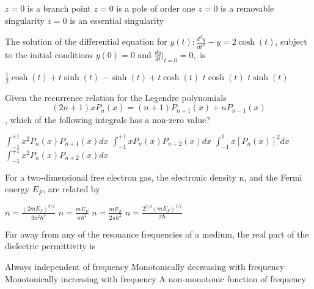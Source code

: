 \documentclass{exam}
\begin{document}
\begin{questions}
\begin{choices}
	\choice $z=0$ is a branch point \choice $z=0$ is a pole of order one
	\choice $z=0$ is a removable singularity \choice $z=0$ is an essential singularity
\end{choices}

\question The solution of the differential equation for $y(t): \frac{d^{2}y}{dt^{2}}-y=2\cosh(t)$, subject to the initial conditions $y(0)=0$ and $\frac{dy}{dt}|_{t=0}=0,$ is\hfill{}

\begin{choices}
	\begin{multicols}{2}
	 \choice $\frac{1}{2}\cosh(t)+t\sinh(t)$ \choice $-\sinh(t)+t\cosh(t)$
	\choice $t\cosh(t)$ \choice $t\sinh(t)$
	\end{multicols}
\end{choices}

\question Given the recurrence relation for the Legendre polynomials $$(2n+1) x P_n(x)=(n+1) P_{n+1}(x)+nP_{n-1}(x)$$, which of the following integrals has a non-zero value?\hfill{}

\begin{choices}
	\begin{multicols}{2}
	 \choice $\int_{-1}^{+1}x^{2}P_{n}(x)P_{n+1}(x)dx$ \choice $\int_{-1}^{+1}x P_{n}(x)P_{n+2}(x)dx$
	\choice $\int_{-1}^{1}x[P_{n}(x)]^{2}dx$ \choice $\int_{-1}^{+1}x^{2}P_{n}(x)P_{n+2}(x)dx$
	\end{multicols}
\end{choices}

\question For a two-dimensional free electron gas, the electronic density n, and the Fermi energy $E_F$, are related by\hfill{}

\begin{choices}
	\begin{multicols}{2}
	 \choice $n=\frac{(2mE_{F})^{3/2}}{3\pi^{2}\hbar^{3}}$ \choice $n=\frac{mE_{F}}{\pi\hbar^{2}}$
	\choice $n=\frac{mE_{F}}{2\pi\hbar^{2}}$ \choice $n=\frac{2^{3/2}(mE_{F})^{1/2}}{\pi\hbar}$
	\end{multicols}
\end{choices}

\question Far away from any of the resonance frequencies of a medium, the real part of the dielectric permittivity is\hfill{}

\begin{choices}
	\begin{multicols}{2}
	 \choice Always independent of frequency \choice Monotonically decreasing with frequency
	\choice Monotonically increasing with frequency \choice A non-monotonic function of frequency
	\end{multicols}
\end{choices}


\end{questions}
\end{document}
